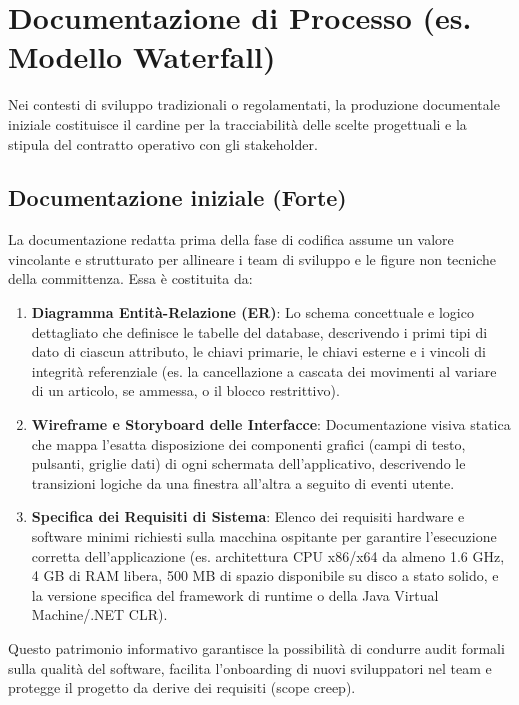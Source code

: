\documentclass[a4paper,12pt]{article}
\begin{document}
	\section{Documentazione di Processo (es. Modello Waterfall)}
	Nei contesti di sviluppo tradizionali o regolamentati, la produzione documentale iniziale costituisce il cardine per la tracciabilità delle scelte progettuali e la stipula del contratto operativo con gli stakeholder.
	
	\subsection{Documentazione iniziale (Forte)}
	La documentazione redatta prima della fase di codifica assume un valore vincolante e strutturato per allineare i team di sviluppo e le figure non tecniche della committenza. Essa è costituita da:
	\begin{enumerate}
		\item \textbf{Diagramma Entità-Relazione (ER)}: Lo schema concettuale e logico dettagliato che definisce le tabelle del database, descrivendo i primi tipi di dato di ciascun attributo, le chiavi primarie, le chiavi esterne e i vincoli di integrità referenziale (es. la cancellazione a cascata dei movimenti al variare di un articolo, se ammessa, o il blocco restrittivo).
		\item \textbf{Wireframe e Storyboard delle Interfacce}: Documentazione visiva statica che mappa l'esatta disposizione dei componenti grafici (campi di testo, pulsanti, griglie dati) di ogni schermata dell'applicativo, descrivendo le transizioni logiche da una finestra all'altra a seguito di eventi utente.
		\item \textbf{Specifica dei Requisiti di Sistema}: Elenco dei requisiti hardware e software minimi richiesti sulla macchina ospitante per garantire l'esecuzione corretta dell'applicazione (es. architettura CPU x86/x64 da almeno 1.6 GHz, 4 GB di RAM libera, 500 MB di spazio disponibile su disco a stato solido, e la versione specifica del framework di runtime o della Java Virtual Machine/.NET CLR).
	\end{enumerate}
	Questo patrimonio informativo garantisce la possibilità di condurre audit formali sulla qualità del software, facilita l'onboarding di nuovi sviluppatori nel team e protegge il progetto da derive dei requisiti (scope creep).
	
\end{document}
